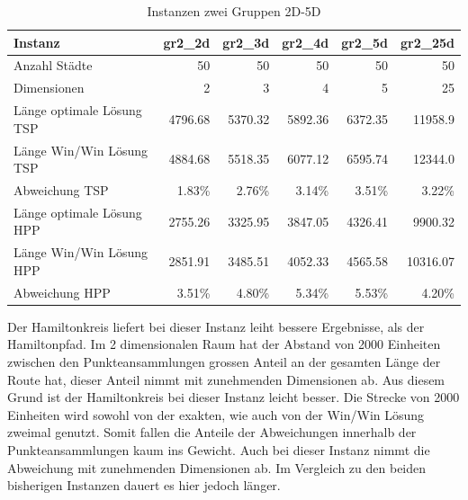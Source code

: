 \documentclass[11pt,a4paper]{article}
\begin{document}
\begin{table}[H]
        \centering
        \begin{tabular}{| l | r | r | r | r | r |}
            \hline
            Instanz                     & \textbf{gr2\_2d}     
                                        & \textbf{gr2\_3d}     
                                        & \textbf{gr2\_4d}     
                                        & \textbf{gr2\_5d}     
                                        & \textbf{gr2\_25d}             \\ \hline
                Anzahl Städte               & 50        & 50       & 50         & 50        & 50        \\ \hline
                Dimensionen                 & 2         & 3        & 4          & 5         & 25        \\ \hline
                Länge optimale Lösung TSP   & 4796.68   & 5370.32  & 5892.36    & 6372.35   & 11958.9   \\ \hline
                Länge Win/Win Lösung  TSP   & 4884.68   & 5518.35  & 6077.12    & 6595.74   & 12344.0   \\ \hline
                Abweichung TSP              &  1.83\%   &  2.76\%  &  3.14\%    &  3.51\%   & 3.22\%    \\ \hline
                Länge optimale Lösung HPP   & 2755.26   & 3325.95  & 3847.05    & 4326.41   & 9900.32   \\ \hline
                Länge Win/Win Lösung  HPP   & 2851.91   & 3485.51  & 4052.33    & 4565.58   & 10316.07  \\ \hline
                Abweichung HPP              &  3.51\%   &  4.80\%  &  5.34\%    &  5.53\%   & 4.20\%    \\ \hline
        \end{tabular}
        \caption{Instanzen zwei Gruppen 2D-5D}
        \label{tab:instanzen_crowds2}
\end{table}

Der Hamiltonkreis liefert bei dieser Instanz leiht bessere Ergebnisse, als der Hamiltonpfad. Im 2 dimensionalen Raum hat der Abstand von 2000 Einheiten zwischen den Punkteansammlungen  grossen Anteil an der gesamten Länge der Route hat, dieser Anteil nimmt mit zunehmenden Dimensionen ab. Aus diesem Grund ist der Hamiltonkreis bei dieser Instanz leicht besser. Die Strecke von 2000 Einheiten wird sowohl von der exakten, wie auch von der Win/Win Lösung zweimal genutzt. Somit fallen die Anteile der Abweichungen innerhalb der Punkteansammlungen kaum ins Gewicht.
Auch bei dieser Instanz nimmt die Abweichung mit zunehmenden Dimensionen ab. Im Vergleich zu den beiden bisherigen Instanzen dauert es hier jedoch länger.
\end{document}
